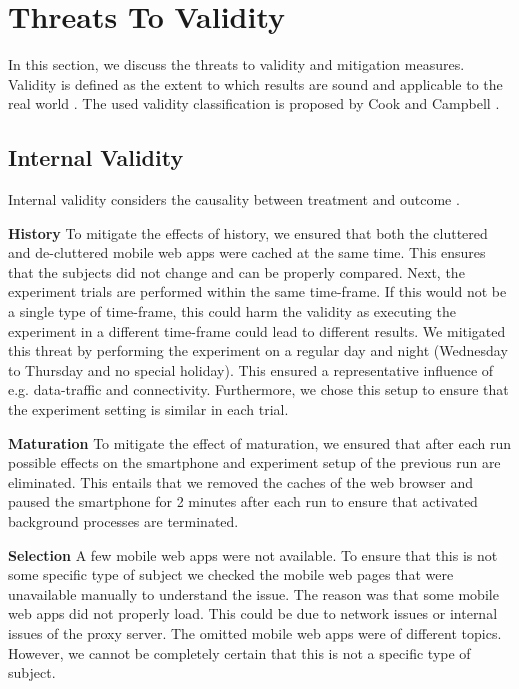 \section{Threats To Validity}\label{sec:threats}

In this section, we discuss the threats to validity and mitigation measures. Validity is defined as the extent to which results are sound and applicable to the real world \cite{wohlin2012experimentation}. The used validity classification is proposed by Cook and Campbell \cite{cook1979quasi}.

\subsection{Internal Validity}

Internal validity considers the causality between treatment and outcome \cite{wohlin2012experimentation}. 

\noindent \textbf{History}
To mitigate the effects of history, we ensured that both the cluttered and de-cluttered mobile web apps were cached at the same time. This ensures that the subjects did not change and can be properly compared. Next, the experiment trials are performed within the same time-frame. If this would not be a single type of time-frame, this could harm the validity as executing the experiment in a different time-frame could lead to different results. We mitigated this threat by performing the experiment on a regular day and night (Wednesday to Thursday and no special holiday). This ensured a representative influence of e.g. data-traffic and connectivity. Furthermore, we chose this setup to ensure that the experiment setting is similar in each trial. 

\noindent \textbf{Maturation} 
To mitigate the effect of maturation, we ensured that after each run possible effects on the smartphone and experiment setup of the previous run are eliminated. This entails that we removed the caches of the web browser and paused the smartphone for 2 minutes after each run to ensure that activated background processes are terminated. 

\noindent \textbf{Selection}
A few mobile web apps were not available. To ensure that this is not some specific type of subject we checked the mobile web pages that were unavailable manually to understand the issue. The reason was that some mobile web apps did not properly load. This could be due to network issues or internal issues of the proxy server. The omitted mobile web apps were of different topics. However, we cannot be completely certain that this is not a specific type of subject. 

